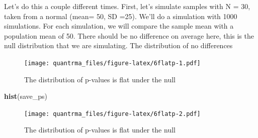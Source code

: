 \documentclass[
]{book}
\newenvironment{Shaded}{\begin{snugshade}}{\end{snugshade}}
\newcommand{\CommentTok}[1]{\textcolor[rgb]{0.56,0.35,0.01}{\textit{#1}}}
\newcommand{\ControlFlowTok}[1]{\textcolor[rgb]{0.13,0.29,0.53}{\textbf{#1}}}
\newcommand{\DataTypeTok}[1]{\textcolor[rgb]{0.13,0.29,0.53}{#1}}
\newcommand{\DecValTok}[1]{\textcolor[rgb]{0.00,0.00,0.81}{#1}}
\newcommand{\KeywordTok}[1]{\textcolor[rgb]{0.13,0.29,0.53}{\textbf{#1}}}
\newcommand{\NormalTok}[1]{#1}
\newcommand{\OperatorTok}[1]{\textcolor[rgb]{0.81,0.36,0.00}{\textbf{#1}}}
\newcommand{\StringTok}[1]{\textcolor[rgb]{0.31,0.60,0.02}{#1}}
\begin{document}
Let's do this a couple different times. First, let's simulate samples with N = 30, taken from a normal (mean= 50, SD =25). We'll do a simulation with 1000 simulations. For each simulation, we will compare the sample mean with a population mean of 50. There should be no difference on average here, this is the null distribution that we are simulating. The distribution of no differences

\begin{Shaded}
\end{Shaded}

\begin{figure}
\centering
\texttt{[image: quantrma\_files/figure-latex/6flatp-1.pdf]}
\caption{\label{fig:6flatp-1}The distribution of p-values is flat under the null}
\end{figure}

\begin{Shaded}
\begin{Highlighting}[]
\KeywordTok{hist}\NormalTok{(save_ps)}
\end{Highlighting}
\end{Shaded}

\begin{figure}
\centering
\texttt{[image: quantrma\_files/figure-latex/6flatp-2.pdf]}
\caption{\label{fig:6flatp-2}The distribution of p-values is flat under the null}
\end{figure}
\end{document}
